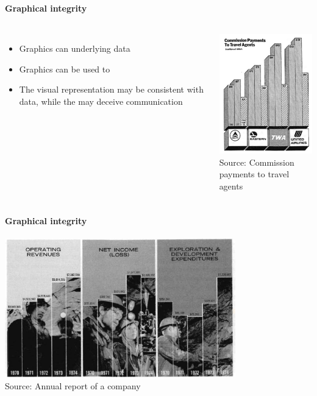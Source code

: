 \documentclass[8pt]{beamer}
\begin{document}


\begin{frame}
\frametitle{\insertsection}
\framesubtitle{Graphical integrity}

\begin{columns}
\begin{itemize}
    \item Graphics can {\color{blue}{distort}} underlying data
    \item Graphics can be used to {\color{blue}{deceive communication}}
    \item The visual representation may be consistent with data, while the {\color{blue}{perceived visual effect}} may deceive communication
\end{itemize}

\centering
\includegraphics[width=5cm]{integrity_commission}\\
\tiny{Source: Commission payments to travel agents \cite{Tufte2001}}

\end{columns}

\end{frame}


\begin{frame}
\frametitle{\insertsection}
\framesubtitle{Graphical integrity}

\centering
\includegraphics[width=10cm]{integrity_mines}\\
\tiny{Source: Annual report of a company \cite{Tufte2001}}

\end{frame}
\end{document}
